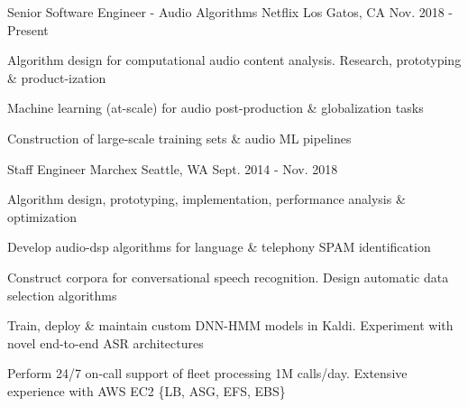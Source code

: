 

\begin{cventries}

  \cventry
    {Senior Software Engineer - Audio Algorithms} %
    {Netflix} %
    {Los Gatos, CA} %
    {Nov. 2018 - Present} %
    {
      \begin{cvitems} %
        \item {Algorithm design for computational audio content analysis. Research, prototyping \& product-ization}
        \item {Machine learning (at-scale) for audio post-production \& globalization tasks}
        \item {Construction of large-scale training sets \& audio ML pipelines}
      \end{cvitems}
    }


  \cventry
    {Staff Engineer} %
    {Marchex} %
    {Seattle, WA} %
    {Sept. 2014 - Nov. 2018} %
    {
      \begin{cvitems} %
        \item {Algorithm design, prototyping, implementation, performance analysis \& optimization}
        \item {Develop audio-dsp algorithms for language \& telephony SPAM identification}
        \item {Construct corpora for conversational speech recognition. Design automatic data selection algorithms}
        \item {Train, deploy \& maintain custom DNN-HMM models in Kaldi. Experiment with novel end-to-end ASR architectures}
        \item {Perform 24/7 on-call support of fleet processing 1M calls/day. Extensive experience with AWS EC2 \{LB, ASG, EFS, EBS\}}
      \end{cvitems}
    }


\end{cventries}
